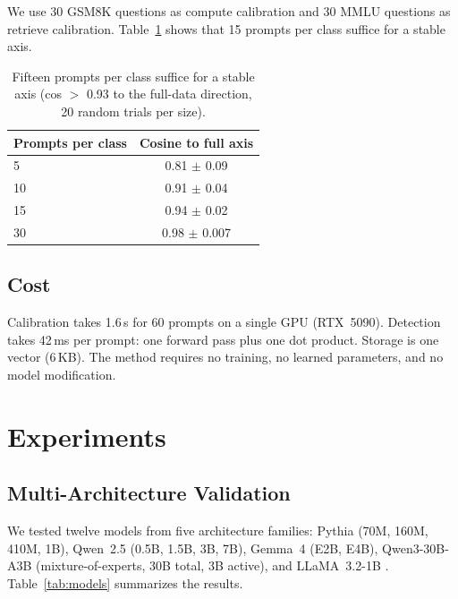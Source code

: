 \documentclass[11pt]{article}
\begin{document}
We use 30 GSM8K questions \citep{cobbe2021gsm8k} as compute calibration and 30 MMLU questions \citep{hendrycks2021mmlu} as retrieve calibration. Table~\ref{tab:robustness_inline} shows that 15 prompts per class suffice for a stable axis.

\begin{table}[h]
\caption{Fifteen prompts per class suffice for a stable axis (cos $>$ 0.93 to the full-data direction, 20 random trials per size).}
\label{tab:robustness_inline}
\vspace{4pt}
\centering
\small
\begin{tabular}{@{}lc@{}}
\toprule
Prompts per class & Cosine to full axis \\
\midrule
5 & 0.81 $\pm$ 0.09 \\
10 & 0.91 $\pm$ 0.04 \\
15 & 0.94 $\pm$ 0.02 \\
30 & 0.98 $\pm$ 0.007 \\
\bottomrule
\end{tabular}
\end{table}

\subsection{Cost}

Calibration takes 1.6\,s for 60 prompts on a single GPU (RTX~5090). Detection takes 42\,ms per prompt: one forward pass plus one dot product. Storage is one vector (6\,KB). The method requires no training, no learned parameters, and no model modification.

\section{Experiments}\label{sec:results}

\subsection{Multi-Architecture Validation}

We tested twelve models from five architecture families: Pythia \citep{biderman2023pythia} (70M, 160M, 410M, 1B), Qwen~2.5 (0.5B, 1.5B, 3B, 7B), Gemma~4 (E2B, E4B), Qwen3-30B-A3B (mixture-of-experts, 30B total, 3B active), and LLaMA~3.2-1B \citep{grattafiori2024llama}. Table~\ref{tab:models} summarizes the results.
\end{document}
